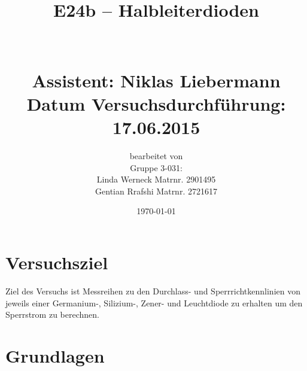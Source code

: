 \documentclass[fontsize=12pt]{scrartcl}
\begin{document}
\begin{minipage}{\textwidth}
\begin{center}\large
\title{ E24b – Halbleiterdioden \\
		~\\
		~\\
		Assistent: Niklas Liebermann \\
		Datum Versuchsdurchführung: \\
		17.06.2015}

\author{bearbeitet von\\
		Gruppe 3-031: \\
		Linda Werneck Matrnr. 2901495 \\
		Gentian Rrafshi Matrnr. 2721617 }
\date{\today}

\maketitle

\end{center}
\end{minipage}

\newpage

\tableofcontents

\newpage
\noindent

\section{ Versuchsziel}
Ziel des Versuchs ist Messreihen zu den Durchlass- und Sperrrichtkennlinien von jeweils einer Germanium-, Silizium-, Zener- und Leuchtdiode zu erhalten um 
den Sperrstrom zu berechnen.

\section{ Grundlagen}
\end{document}

